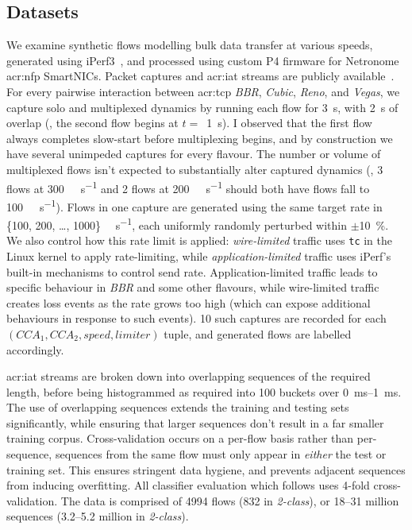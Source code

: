\subsection{Datasets}\label{sec:seidr-datasets}
We examine synthetic flows modelling bulk data transfer at various speeds, generated using iPerf3~\parencite{iperf3}, and processed using custom P4 firmware for Netronome \gls{acr:nfp} SmartNICs.
Packet captures and \gls{acr:iat} streams are publicly available~\parencite{ht-imc-data,ht-imc-poster}.
For every pairwise interaction between \gls{acr:tcp} \emph{BBR}, \emph{Cubic}, \emph{Reno}, and \emph{Vegas}, we capture solo and multiplexed dynamics by running each flow for \qty{3}{\second}, with \qty{2}{\second} of overlap (\ie, the second flow begins at $t=$~\qty{1}{\second}).
I observed that the first flow always completes slow-start before multiplexing begins, and by construction we have several unimpeded captures for every flavour.
The number or volume of multiplexed flows isn't expected to substantially alter captured dynamics (\ie, 3 flows at \qty{300}{\mega\bit\per\second} and 2 flows at \qty{200}{\mega\bit\per\second} should both have flows fall to \qty{100}{\mega\bit\per\second}).
Flows in one capture are generated using the same target rate in \{\num{100}, \num{200}, \dots, \num{1000}\} \unit{\mega\bit\per\second}, each uniformly randomly perturbed within $\pm$\qty{10}{\percent}.
We also control how this rate limit is applied: \emph{wire-limited} traffic uses \texttt{tc} in the Linux kernel to apply rate-limiting, while \emph{application-limited} traffic uses iPerf's built-in mechanisms to control send rate.
Application-limited traffic leads to specific behaviour in \emph{BBR} and some other flavours, while wire-limited traffic creates loss events as the rate grows too high (which can expose additional behaviours in response to such events).
\num{10} such captures are recorded for each $\left(\mathit{CCA}_1,\mathit{CCA}_2,\mathit{speed},\mathit{limiter}\right)$ tuple, and generated flows are labelled accordingly.

\gls{acr:iat} streams are broken down into overlapping sequences of the required length, before being histogrammed as required into \num{100} buckets over \qtyrange{0}{1}{\milli\second}.
The use of overlapping sequences extends the training and testing sets significantly, while ensuring that larger sequences don't result in a far smaller training corpus.
Cross-validation occurs on a per-flow basis rather than per-sequence, \ie sequences from the same flow must only appear in \emph{either} the test or training set.
This ensures stringent data hygiene, and prevents adjacent sequences from inducing overfitting.
All classifier evaluation which follows uses 4-fold cross-validation.
The data is comprised of \num{4994} flows (\num{832} in \emph{2-class}), or \numrange{18}{31} million sequences (\numrange{3.2}{5.2} million in \emph{2-class}).

